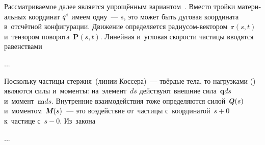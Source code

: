 

\begin{otherlanguage}{russian}

Рассматриваемое далее является упрощённым вариантом~. Вместо тройки материальных координат ${q^{\hspace{.1ex}i}}$ имеем одну~--- $s$, это может быть дуговая координата в~отсчётной конфигурации. Движение определяется радиусом-вектором~${\bm{r}(s,t)}$ и~тензором поворота~${\bm{P}(s,t)}$. Линейная и~угловая скорости частицы вводятся равенствами

...



\end{otherlanguage}



\begin{otherlanguage}{russian}

Поскольку частицы стержня~(линии Коссера)~--- твёрдые тела, то нагрузками () являются силы и~моменты: на~элемент~$ds$ действуют внешние сила~${\bm{q}ds}$ и~момент~${\bm{m}ds}$. Внутренние взаимо\-действия тоже определяются силой~${\mathboldQ \hspace{.1ex} (s)}$ и~моментом~${\mathboldM \hspace{.1ex} (s)}$~--- это воздействие от~частицы с~координатой~${s\!+\!0}$ к~частице с~${s\!-\!0}$. Из~закона

...



\end{otherlanguage}

